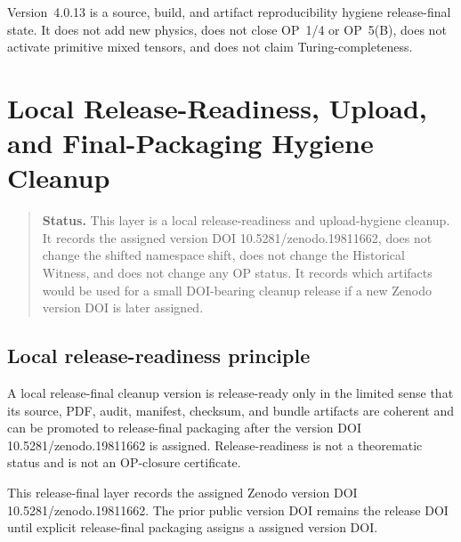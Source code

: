 \begin{remark}
\label{rem:v4013-non-claim}
Version~4.0.13 is a source, build, and artifact reproducibility hygiene
release-final state. It does not add new physics, does not close OP~1/4 or OP~5(B),
does not activate primitive mixed tensors, and does not claim
Turing-completeness.
\end{remark}



\clearpage
\section{ Local Release-Readiness, Upload, and Final-Packaging Hygiene Cleanup}
\label{sec:v4014-local-release-readiness-upload-final-packaging-hygiene-cleanup}

\begin{quote}\small
\noindent\textbf{Status.}
This  layer is a local release-readiness and upload-hygiene cleanup. It
records the assigned version DOI 10.5281/zenodo.19811662, does not change the shifted namespace shift, does not
change the Historical Witness, and does not change any OP status. It records
which artifacts would be used for a small DOI-bearing cleanup release if a new
Zenodo version DOI is later assigned.
\end{quote}

\subsection{Local release-readiness principle}
\label{subsec:v4014-local-release-readiness-principle}

\begin{definition}
\label{def:v4014-local-release-readiness-principle}
A local release-final cleanup version is release-ready only in the limited sense that its
source, PDF, audit, manifest, checksum, and bundle artifacts are coherent and
can be promoted to release-final packaging after the version DOI 10.5281/zenodo.19811662 is assigned.
Release-readiness is not a theorematic status and is not an OP-closure
certificate.
\end{definition}

\begin{remark}
\label{rem:v4014-version-doi-assigned-release-final}
This release-final layer records the assigned Zenodo version DOI 10.5281/zenodo.19811662. The prior public
version DOI remains the  release DOI until explicit release-final
packaging assigns a assigned version DOI.
\end{remark}

